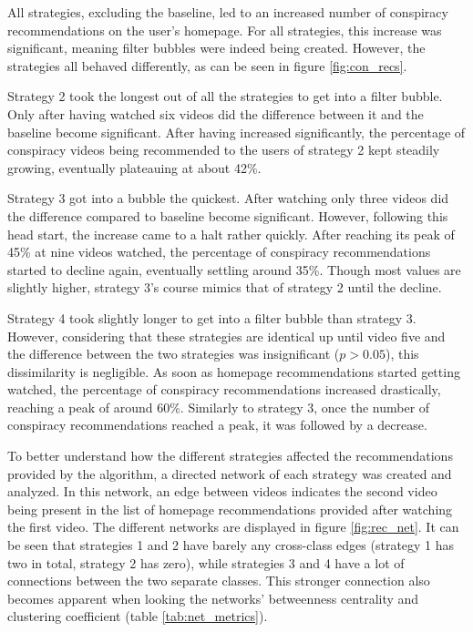 \documentclass[../main.tex]{subfiles}
\begin{document}
All strategies, excluding the baseline, led to an increased number of conspiracy recommendations on the 
user's homepage. For all strategies, this increase was significant, meaning filter bubbles were indeed being 
created. However, the strategies all behaved differently, as can be seen in figure \ref{fig:con_recs}. 

Strategy 2 took the longest out of all the strategies to get into a filter bubble. Only after having watched 
six videos did the difference between it and the baseline become significant. After having increased 
significantly, the percentage of conspiracy videos being recommended to the users of strategy 2 kept steadily 
growing, eventually plateauing at about 42\%. 

Strategy 3 got into a bubble the quickest. After watching only three videos did the difference compared to
baseline become significant. However, following this head start, the increase came to a halt rather quickly. 
After reaching its peak of 45\% at nine videos watched, the percentage of conspiracy recommendations started 
to decline again, eventually settling around 35\%. Though most values are slightly higher, strategy 3's 
course mimics that of strategy 2 until the decline. 

Strategy 4 took slightly longer to get into a filter bubble than strategy 3. However, considering that these 
strategies are identical up until video five and the difference between the two strategies was insignificant 
($p > 0.05$), this dissimilarity is negligible. As soon as homepage recommendations started getting watched, 
the percentage of conspiracy recommendations increased drastically, reaching a peak of around 60\%. Similarly
to strategy 3, once the number of conspiracy recommendations reached a peak, it was followed by a decrease. 

To better understand how the different strategies affected the recommendations provided by the algorithm, a 
directed network of each strategy was created and analyzed. In this network, an edge between videos 
indicates the second video being present in the list of homepage recommendations provided after watching the 
first video. The different networks are displayed in figure \ref{fig:rec_net}. It can be seen that strategies
1 and 2 have barely any cross-class edges (strategy 1 has two in total, strategy 2 has zero), while 
strategies 3 and 4 have a lot of connections between the two separate classes. This stronger connection also 
becomes apparent when looking the networks' betweenness centrality and clustering coefficient (table 
\ref{tab:net_metrics}). 
\end{document}
